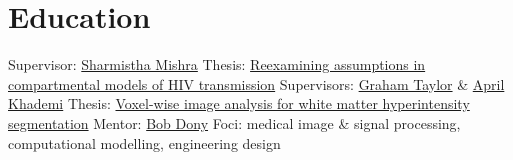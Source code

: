 \section{Education}\twodate
{}
  \bullet Supervisor: \href{https://mishra-lab.ca}{Sharmistha Mishra}
  \bullet Thesis: \href{https://hdl.handle.net/1807/129897}
    {Reexamining assumptions in compartmental models of HIV transmission}
  \bullet Supervisors: \href{https://www.gwtaylor.ca}{Graham Taylor} \&
                       \href{https://www.torontomu.ca/akhademi}{April Khademi}
  \bullet Thesis: \href{http://hdl.handle.net/10214/12142}
    {Voxel-wise image analysis for white matter hyperintensity segmentation}
  \bullet Mentor: \href{https://www.uoguelph.ca/ceps/people/bob-dony}{Bob Dony}
  \bullet Foci: medical image \& signal processing, computational modelling, engineering design
